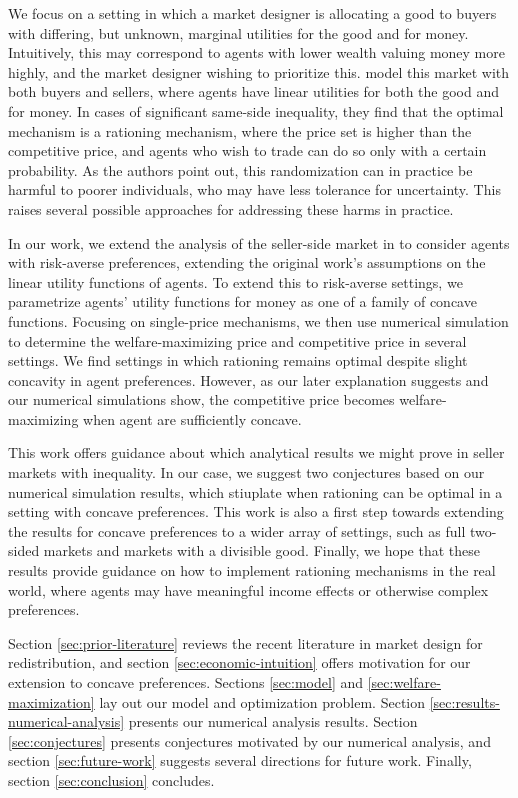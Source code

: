 \documentclass[AER]{AEA}
\begin{document}
We focus on a setting in which a market designer is allocating a good to buyers with differing, but unknown, marginal utilities for the good and for money. Intuitively, this may correspond to agents with lower wealth valuing money more highly, and the market designer wishing to prioritize this. \cite{dworczak-2020} model this market with both buyers and sellers, where agents have linear utilities for both the good and for money. In cases of significant same-side inequality, they find that the optimal mechanism is a rationing mechanism, where the price set is higher than the competitive price, and agents who wish to trade can do so only with a certain probability. As the authors point out, this randomization can in practice be harmful to poorer individuals, who may have less tolerance for uncertainty. This raises several possible approaches for addressing these harms in practice.

In our work, we extend the analysis of the seller-side market in \cite{dworczak-2020} to consider agents with risk-averse preferences, extending the original work's assumptions on the linear utility functions of agents. To extend this to risk-averse settings, we parametrize agents' utility functions for money as one of a family of concave functions. Focusing on single-price mechanisms, we then use numerical simulation to determine the welfare-maximizing price and competitive price in several settings. We find settings in which rationing remains optimal despite slight concavity in agent preferences. However, as our later explanation suggests and our numerical simulations show, the competitive price becomes welfare-maximizing when agent are sufficiently concave.

This work offers guidance about which analytical results we might prove in seller markets with inequality. In our case, we suggest two conjectures based on our numerical simulation results, which stiuplate when rationing can be optimal in a setting with concave preferences. This work is also a first step towards extending the results for concave preferences to a wider array of settings, such as full two-sided markets and markets with a divisible good. Finally, we hope that these results provide guidance on how to implement rationing mechanisms in the real world, where agents may have meaningful income effects or otherwise complex preferences.

Section \ref{sec:prior-literature} reviews the recent literature in market design for redistribution, and section \ref{sec:economic-intuition} offers motivation for our extension to concave preferences. Sections \ref{sec:model} and \ref{sec:welfare-maximization} lay out our model and optimization problem. Section \ref{sec:results-numerical-analysis} presents our numerical analysis results. Section \ref{sec:conjectures} presents conjectures motivated by our numerical analysis, and section \ref{sec:future-work} suggests several directions for future work. Finally, section \ref{sec:conclusion} concludes.
\end{document}
